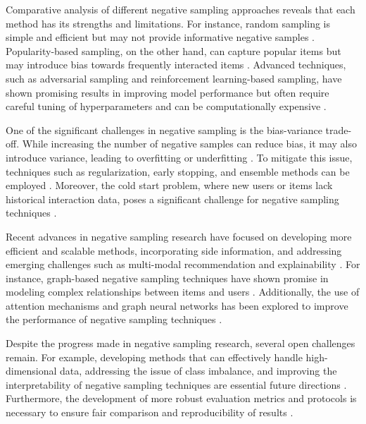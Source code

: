 \documentclass[11pt,a4paper]{article}
\begin{document}
Comparative analysis of different negative sampling approaches reveals that each method has its strengths and limitations. For instance, random sampling is simple and efficient but may not provide informative negative samples \cite{doi:10.1145/3331184.3331337}. Popularity-based sampling, on the other hand, can capture popular items but may introduce bias towards frequently interacted items \cite{arxiv:2006.15772}. Advanced techniques, such as adversarial sampling and reinforcement learning-based sampling, have shown promising results in improving model performance but often require careful tuning of hyperparameters and can be computationally expensive \cite{doi:10.1109/tkde.2022.3187013}.

One of the significant challenges in negative sampling is the bias-variance trade-off. While increasing the number of negative samples can reduce bias, it may also introduce variance, leading to overfitting or underfitting \cite{doi:10.1186/1758-2946-6-32}. To mitigate this issue, techniques such as regularization, early stopping, and ensemble methods can be employed \cite{doi:10.1002/cpe.7894}. Moreover, the cold start problem, where new users or items lack historical interaction data, poses a significant challenge for negative sampling techniques \cite{doi:10.1016/j.knosys.2011.07.021}.

Recent advances in negative sampling research have focused on developing more efficient and scalable methods, incorporating side information, and addressing emerging challenges such as multi-modal recommendation and explainability \cite{arxiv:1905.06589}. For instance, graph-based negative sampling techniques have shown promise in modeling complex relationships between items and users \cite{doi:10.1609/aaai.v32i1.11835}. Additionally, the use of attention mechanisms and graph neural networks has been explored to improve the performance of negative sampling techniques \cite{doi:10.1609/aaai.v34i04.5894}.

Despite the progress made in negative sampling research, several open challenges remain. For example, developing methods that can effectively handle high-dimensional data, addressing the issue of class imbalance, and improving the interpretability of negative sampling techniques are essential future directions \cite{doi:10.1587/transinf.2017edr0003}. Furthermore, the development of more robust evaluation metrics and protocols is necessary to ensure fair comparison and reproducibility of results \cite{doi:10.1145/3404835.3463245}.
\end{document}

